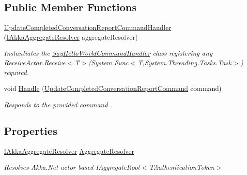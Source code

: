 \subsection*{Public Member Functions}
\begin{DoxyCompactItemize}
\item 
\hyperlink{classCqrs_1_1Akka_1_1Tests_1_1Unit_1_1Commands_1_1Handlers_1_1UpdateCompletedConversationReportCommandHandler_a816316549866b3e4abb410a7b9ea06a3_a816316549866b3e4abb410a7b9ea06a3}{Update\+Completed\+Conversation\+Report\+Command\+Handler} (\hyperlink{interfaceCqrs_1_1Akka_1_1Domain_1_1IAkkaAggregateResolver}{I\+Akka\+Aggregate\+Resolver} aggregate\+Resolver)
\begin{DoxyCompactList}\small\item\em Instantiates the \hyperlink{classCqrs_1_1Akka_1_1Tests_1_1Unit_1_1Commands_1_1Handlers_1_1SayHelloWorldCommandHandler}{Say\+Hello\+World\+Command\+Handler} class registering any Receive\+Actor.\+Receive$<$\+T$>$(\+System.\+Func$<$\+T,\+System.\+Threading.\+Tasks.\+Task$>$) required. \end{DoxyCompactList}\item 
void \hyperlink{classCqrs_1_1Akka_1_1Tests_1_1Unit_1_1Commands_1_1Handlers_1_1UpdateCompletedConversationReportCommandHandler_aecb596ab5c5e17823b93ac4fcae0e43e_aecb596ab5c5e17823b93ac4fcae0e43e}{Handle} (\hyperlink{classCqrs_1_1Akka_1_1Tests_1_1Unit_1_1Commands_1_1UpdateCompletedConversationReportCommand}{Update\+Completed\+Conversation\+Report\+Command} command)
\begin{DoxyCompactList}\small\item\em Responds to the provided {\itshape command} . \end{DoxyCompactList}\end{DoxyCompactItemize}
\subsection*{Properties}
\begin{DoxyCompactItemize}
\item 
\hyperlink{interfaceCqrs_1_1Akka_1_1Domain_1_1IAkkaAggregateResolver}{I\+Akka\+Aggregate\+Resolver} \hyperlink{classCqrs_1_1Akka_1_1Tests_1_1Unit_1_1Commands_1_1Handlers_1_1UpdateCompletedConversationReportCommandHandler_af5cde3b1fadb7cb1962301a67aa9339b_af5cde3b1fadb7cb1962301a67aa9339b}{Aggregate\+Resolver}
\begin{DoxyCompactList}\small\item\em Resolves Akka.\+Net actor based I\+Aggregate\+Root$<$\+T\+Authentication\+Token$>$ \end{DoxyCompactList}\end{DoxyCompactItemize}


